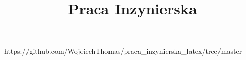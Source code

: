 \documentclass[11pt]{article}
\title{Praca Inzynierska}
\begin{document}
\maketitle 

https://github.com/WojciechThomas/praca_inzynierska_latex/tree/master
\end{document}
